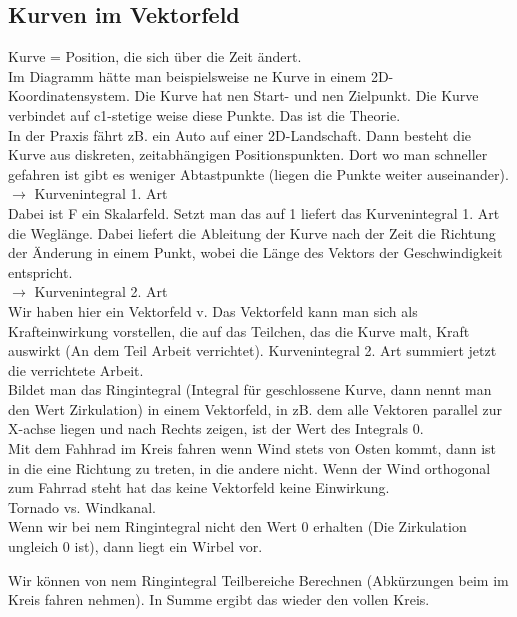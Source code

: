 \documentclass{article}
\begin{document}
\subsection{Kurven im Vektorfeld}
Kurve = Position, die sich über die Zeit ändert.\\
Im Diagramm hätte man beispielsweise ne Kurve in einem 2D-Koordinatensystem. Die Kurve hat nen Start- und nen Zielpunkt. Die Kurve verbindet auf c1-stetige weise diese Punkte. Das ist die Theorie.\\

\noindent In der Praxis fährt zB. ein Auto auf einer 2D-Landschaft. Dann besteht die Kurve aus diskreten, zeitabhängigen Positionspunkten. Dort wo man schneller gefahren ist gibt es weniger Abtastpunkte (liegen die Punkte weiter auseinander). \\

\noindent  $\rightarrow$ Kurvenintegral 1. Art\\ 
Dabei ist F ein Skalarfeld. Setzt man das auf 1 liefert das Kurvenintegral 1. Art die Weglänge. 
Dabei liefert die Ableitung der Kurve nach der Zeit die Richtung der Änderung in einem Punkt, wobei die Länge des Vektors der Geschwindigkeit entspricht.\\

\noindent  $\rightarrow$ Kurvenintegral 2. Art\\ 
Wir haben hier ein Vektorfeld v. Das Vektorfeld kann man sich als Krafteinwirkung vorstellen, die auf das Teilchen, das die Kurve malt, Kraft auswirkt (An dem Teil Arbeit verrichtet). Kurvenintegral 2. Art summiert jetzt die verrichtete Arbeit.\\

\noindent Bildet man das Ringintegral (Integral für geschlossene Kurve, dann nennt man den Wert Zirkulation) in einem Vektorfeld, in zB. dem alle Vektoren parallel zur X-achse liegen und nach Rechts zeigen, ist der Wert des Integrals 0.\\
Mit dem Fahhrad im Kreis fahren wenn Wind stets von Osten kommt, dann ist in die eine Richtung zu treten, in die andere nicht. Wenn der Wind orthogonal zum Fahrrad steht hat das keine Vektorfeld keine Einwirkung.\\

Tornado vs. Windkanal.\\

\noindent Wenn wir bei nem Ringintegral nicht den Wert 0 erhalten (Die Zirkulation ungleich 0 ist), dann liegt ein Wirbel vor.


\noindent  Wir können von nem Ringintegral Teilbereiche Berechnen (Abkürzungen beim im Kreis fahren nehmen). In Summe ergibt das wieder den vollen Kreis.\\
 
\end{document}
